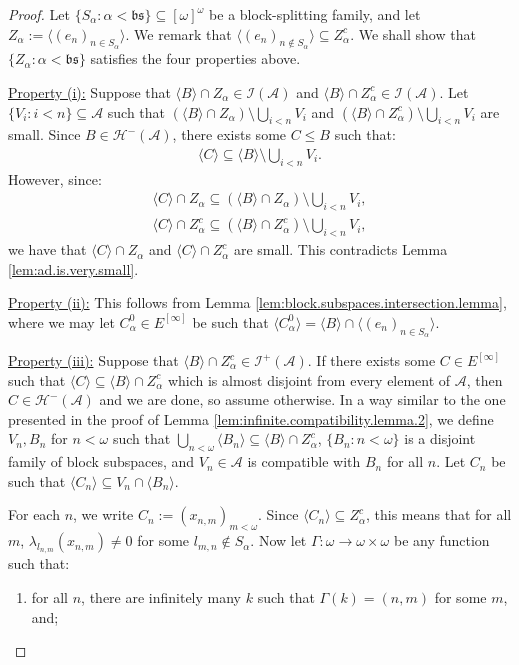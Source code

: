 \documentclass[10pt,a4paper]{amsart}
\theoremstyle{plain}
\numberwithin{equation}{section}
\theoremstyle{definition}
\renewcommand{\c}[1]{\langle #1 \rangle}
\newcommand{\cal}{\mathcal}
\renewcommand{\frak}{\mathfrak}
\newcommand{\A}{\cal{A}}
\renewcommand{\H}{\cal{H}}
\newcommand{\I}{\cal{I}}
\begin{document}
\begin{proof}
    Let $\{S_\alpha : \alpha < \frak{bs}\} \subseteq [\omega]^\omega$ be a block-splitting family, and let $Z_\alpha := \c{(e_n)_{n \in S_\alpha}}$. We remark that $\c{(e_n)_{n \notin S_\alpha}} \subseteq Z_\alpha^c$. We shall show that $\{Z_\alpha : \alpha < \frak{bs}\}$ satisfies the four properties above. 

    \underline{Property (i):} Suppose that $\c{B} \cap Z_\alpha \in \I(\A)$ and $\c{B} \cap Z_\alpha^c \in \I(\A)$. Let $\{V_i : i < n\} \subseteq \A$ such that $(\c{B} \cap Z_\alpha) \setminus \bigcup_{i<n} V_i$ and $(\c{B} \cap Z_\alpha^c) \setminus \bigcup_{i<n} V_i$ are small. Since $B \in \H^-(\A)$, there exists some $C \leq B$ such that:
    \begin{align*}
        \c{C} \subseteq \c{B} \setminus \bigcup_{i<n} V_i.
    \end{align*}
    However, since:
    \begin{align*}
        \c{C} \cap Z_\alpha \subseteq (\c{B} \cap Z_\alpha) \setminus \bigcup_{i<n} V_i, \\        
        \c{C} \cap Z_\alpha^c \subseteq (\c{B} \cap Z_\alpha^c) \setminus \bigcup_{i<n} V_i,
    \end{align*}
    we have that $\c{C} \cap Z_\alpha$ and $\c{C} \cap Z_\alpha^c$ are small. This contradicts Lemma \ref{lem:ad.is.very.small}.

    \underline{Property (ii):} This follows from Lemma \ref{lem:block.subspaces.intersection.lemma}, where we may let $C_\alpha^0 \in E^{[\infty]}$ be such that $\c{C_\alpha^0} = \c{B} \cap \c{(e_n)_{n \in S_\alpha}}$.
    
    \underline{Property (iii):} Suppose that $\c{B} \cap Z_\alpha^c \in \I^+(\A)$. If there exists some $C \in E^{[\infty]}$ such that $\c{C} \subseteq \c{B} \cap Z_\alpha^c$ which is almost disjoint from every element of $\A$, then $C \in \H^-(\A)$ and we are done, so assume otherwise. In a way similar to the one presented in the proof of Lemma \ref{lem:infinite.compatibility.lemma.2}, we define $V_n,B_n$ for $n < \omega$ such that $\bigcup_{n<\omega} \c{B_n} \subseteq \c{B} \cap Z_\alpha^c$, $\{B_n : n < \omega\}$ is a disjoint family of block subspaces, and $V_n \in \A$ is compatible with $B_n$ for all $n$. Let $C_n$ be such that $\c{C_n} \subseteq V_n \cap \c{B_n}$. 
    
    For each $n$, we write $C_n := (x_{n,m})_{m<\omega}$. Since $\c{C_n} \subseteq Z_\alpha^c$, this means that for all $m$, $\lambda_{l_{n,m}}(x_{n,m}) \neq 0$ for some $l_{m,n} \notin S_\alpha$. Now let $\Gamma : \omega \to \omega \times \omega$ be any function such that:
    \begin{enumerate}
        \item for all $n$, there are infinitely many $k$ such that $\Gamma(k) = (n,m)$ for some $m$, and;


\end{enumerate}
\end{proof}
\end{document}

